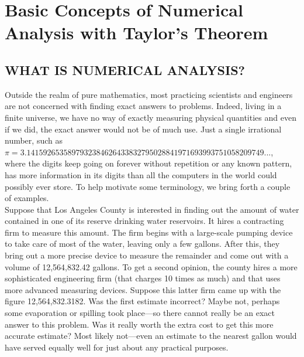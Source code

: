 \documentclass[../main.tex]{subfiles}
\begin{document}
\chapter{Basic Concepts of Numerical Analysis with Taylor's Theorem } 

\section{WHAT IS NUMERICAL ANALYSIS?}

Outside the realm of pure mathematics, most practicing scientists and engineers are 
not concerned with finding exact answers to problems. Indeed, living in a finite 
universe, we have no way of exactly measuring physical quantities and even if we 
did, the exact answer would not be of much use. Just a single irrational number, 
such as\\


$\pi = 3.1415926535897932384626433832795028841971693993751058209749...$,\\ 


where the digits keep going on forever without repetition or any known pattern, 
has more information in its digits than all the computers in the world could 
possibly ever store. To help motivate some terminology, we bring forth a couple 
of examples. \\

Suppose that Los Angeles County is interested in finding out the amount of water 
contained in one of its reserve drinking water reservoirs. It hires a contracting firm 
to measure this amount. The firm begins with a large-scale pumping device to take 
care of most of the water, leaving only a few gallons. After this, they bring out a 
more precise device to measure the remainder and come out with a volume of 
12,564,832.42 gallons. To get a second opinion, the county hires a more 
sophisticated engineering firm (that charges 10 times as much) and that uses more 
advanced measuring devices. Suppose this latter firm came up with the figure 
12,564,832.3182. Was the first estimate incorrect? Maybe not, perhaps some 
evaporation or spilling took place—so there cannot really be an exact answer to 
this problem. Was it really worth the extra cost to get this more accurate estimate? 
Most likely not—even an estimate to the nearest gallon would have served equally 
well for just about any practical purposes.\\
\end{document}
